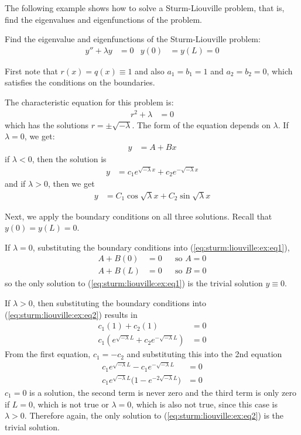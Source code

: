 The following example shows how to solve a Sturm-Liouville problem, that is, find the eigenvalues and eigenfunctions of the problem.

\begin{example} \label{ex:sturm:liouville}
Find the eigenvalue and eigenfunctions of the Sturm-Liouville problem:
\begin{align*}
y''+\lambda y & = 0 & y(0) & = y(L)  = 0
\end{align*}

\solution

First note that $r(x)=q(x) \equiv 1$ and also $a_1=b_1=1$ and $a_2=b_2=0$, which satisfies the conditions on the boundaries.

The characteristic equation for this problem is:
%
\begin{align*}
r^2+\lambda & = 0
\end{align*}
which has the solutions $r = \pm \sqrt{-\lambda}$.  The form of the equation depends on $\lambda$.  If $\lambda=0$, we get:
%
\begin{align} \label{eq:sturm:liouville:ex:eq1}
y & = A + B x
\end{align}
if $\lambda<0$, then the solution is
%
\begin{align} \label{eq:sturm:liouville:ex:eq2}
y & = c_1 e^{\sqrt{-\lambda} x} + c_2 e^{-\sqrt{-\lambda} x}
\end{align}
and if $\lambda>0$, then we get
%
\begin{align} \label{eq:sturm:liouville:ex:eq3}
y & = C_1 \cos \sqrt{\lambda} x + C_2 \sin \sqrt{\lambda} x
\end{align}

Next, we apply the boundary conditions on all three solutions.  Recall that $y(0)=y(L)=0$.

If $\lambda = 0$, substituting the boundary conditions into (\ref{eq:sturm:liouville:ex:eq1}),
%
\begin{align*}
A+ B(0)& = 0 && \text{so $A=0$} \\
A+B(L) & = 0 && \text{so $B=0$}
\end{align*}
so the only solution to (\ref{eq:sturm:liouville:ex:eq1}) is the trivial solution $y\equiv 0$.

If $\lambda >0$, then substituting the boundary conditions into (\ref{eq:sturm:liouville:ex:eq2}) results in
\begin{align*}
c_1 (1) + c_2(1) & = 0 \\
c_1(e^{\sqrt{-\lambda} L} + c_2 e^{-\sqrt{-\lambda} L}) & = 0
\end{align*}
From the first equation, $c_1=-c_2$ and substituting this into the 2nd equation
%
\begin{align*}
c_1 e^{\sqrt{-\lambda} L} - c_1 e^{-\sqrt{-\lambda} L} & = 0 \\
c_1 e^{\sqrt{-\lambda}L} \bigl( 1- e^{-2\sqrt{-\lambda} L}) & = 0
\end{align*}
$c_1=0$ is a solution, the second term is never zero and the third term is only zero if $L=0$, which is not true or $\lambda=0$, which is also not true, since this case is $\lambda >0$.  Therefore again, the only solution to (\ref{eq:sturm:liouville:ex:eq2}) is the trivial solution.


\end{example}
